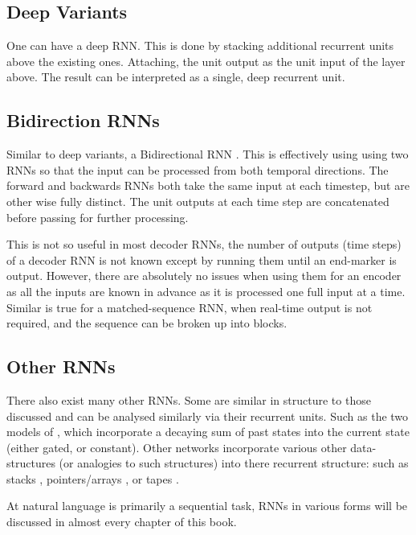 \documentclass[12pt,parskip]{komatufte}\right
\begin{document}
\subsection{Deep Variants}
One can have a deep RNN.
This is done by stacking additional recurrent units above the existing ones.
Attaching, the unit output as the unit input of the layer above.
The result can be interpreted as a single, deep recurrent unit.

\subsection{Bidirection RNNs}\label{sec:bidirection-rnns}
Similar to deep variants, a Bidirectional RNN .
This is effectively using using two RNNs so that the input can be processed from both temporal directions.
The forward and backwards RNNs both take the same input at each timestep, but are other wise fully distinct.
The unit outputs at each time step are concatenated before passing for further processing.

This is not so useful in most decoder RNNs, the number of outputs (time steps) of a decoder RNN is not known except by running them until an end-marker is output.
However, there are absolutely no issues when using them for an encoder as all the inputs are known in advance as it is processed one full input at a time.
Similar is true for a matched-sequence RNN, when real-time output is not required, and the sequence can be broken up into blocks.


\subsection{Other RNNs}
There also exist many other RNNs.
Some are similar in structure to those discussed and can be analysed similarly via their recurrent units.
Such as the two models of , which incorporate a decaying sum of past states into the current state (either gated, or constant).
Other networks incorporate various other data-structures (or analogies to such structures) into there recurrent structure:
such as stacks , pointers/arrays , or tapes .

At natural language is primarily a sequential task, RNNs in various forms will be discussed in almost every chapter of this book.
 
\end{document}
